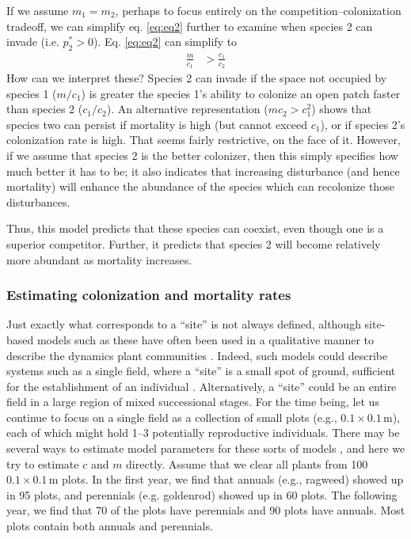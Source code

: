  If we assume $m_1=m_2$, perhaps to focus entirely on the competition--colonization tradeoff, we can simplify eq. \ref{eq:eq2} further to examine when species 2 can invade (i.e. $p_2^* >0$). Eq. \ref{eq:eq2} can simplify to
\begin{align}
  \label{eq:cc7}
  \frac{m}{c_1} &> \frac{c_1}{c_2}
\end{align}
How can we interpret these? Species 2 can invade if the space not occupied by species 1 ($m/c_1$) is greater the species 1's ability to colonize an open patch faster than species 2 ($c_1/c_2$). An alternative representation ($mc_2 > c_1^2$) shows that species two can persist if mortality is high (but cannot exceed $c_1$), or if species 2's colonization rate is high. That seems fairly restrictive, on the face of it. However, if we assume that species 2 is the better colonizer, then this simply specifies how much better it has to be; it also indicates that increasing disturbance (and hence mortality) will enhance the abundance of the species which can recolonize those disturbances.

Thus, this model predicts that these species can coexist, even though one is a superior competitor. Further, it predicts that species 2 will become relatively more abundant as mortality increases.


\subsubsection{Estimating colonization and mortality rates}
Just exactly what corresponds to a ``site'' is not always defined, although site-based models such as these have often been used in a qualitative manner to describe the dynamics plant communities \cite{Hurtt1995, Tilman1994, Pacala1997, Pacala1998}. Indeed, such models could describe systems such as a single field, where a ``site'' is a small spot of ground, sufficient for the establishment of an individual \cite{Tilman1994}. Alternatively, a ``site'' could be an entire field in a large region of mixed successional stages. For the time being, let us continue to focus on a single field as a collection of small plots (e.g., $0.1 \times 0.1$\,m), each of which might hold 1--3 potentially reproductive individuals. There may be several ways to estimate model parameters for these sorts of models \cite{Pacala1998, Tilman1994}, and here we try to estimate $c$ and $m$ directly. Assume that we clear all plants from 100 $0.1 \times 0.1$\,m  plots. In the first year, we find that annuals (e.g., ragweed) showed up in 95 plots, and perennials (e.g. goldenrod) showed up in 60 plots. The following year, we find that 70 of the plots have perennials and 90 plots have annuals. Most plots contain both annuals and perennials.

